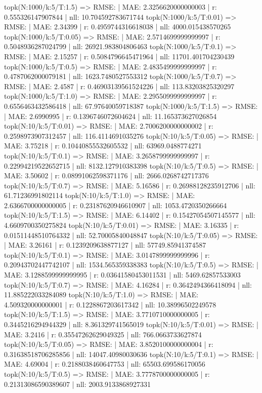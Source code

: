 topk(N:1000/k:5/T:1.5) => RMSE: | MAE: 2.3256620000000003 | r: 0.555326147907844 | nll: 10.704592783671744
topk(N:1000/k:5/T:0.01) => RMSE: | MAE: 2.34399 | r: 0.4959744316618038 | nll: 4000.015438570265
topk(N:1000/k:5/T:0.05) => RMSE: | MAE: 2.5714699999999997 | r: 0.5048936287024799 | nll: 26921.983804806463
topk(N:1000/k:5/T:0.1) => RMSE: | MAE: 2.15257 | r: 0.5084796645471964 | nll: 11701.401704230439
topk(N:1000/k:5/T:0.5) => RMSE: | MAE: 2.4835499999999997 | r: 0.4787062000079181 | nll: 1623.7480527553312
topk(N:1000/k:5/T:0.7) => RMSE: | MAE: 2.4587 | r: 0.46903139561524226 | nll: 113.83203825320297
topk(N:1000/k:5/T:1.0) => RMSE: | MAE: 2.2955099999999997 | r: 0.6556463432586418 | nll: 67.97640059718387
topk(N:1000/k:5/T:1.5) => RMSE: | MAE: 2.6990995 | r: 0.1396746072604624 | nll: 11.165373627026854
topk(N:10/k:5/T:0.01) => RMSE: | MAE: 2.7006200000000002 | r: 0.2598973907312457 | nll: 116.4114691035276
topk(N:10/k:5/T:0.05) => RMSE: | MAE: 3.75218 | r: 0.10440855532605532 | nll: 63969.0488774271
topk(N:10/k:5/T:0.1) => RMSE: | MAE: 3.2658799999999997 | r: 0.22994219522652715 | nll: 8132.127910383398
topk(N:10/k:5/T:0.5) => RMSE: | MAE: 3.50602 | r: 0.08991062598371176 | nll: 2666.0268742717376
topk(N:10/k:5/T:0.7) => RMSE: | MAE: 5.16586 | r: 0.26988128235912706 | nll: 61.71236991802114
topk(N:10/k:5/T:1.0) => RMSE: | MAE: 2.6366700000000005 | r: 0.23187620946610907 | nll: 1053.4720350266664
topk(N:10/k:5/T:1.5) => RMSE: | MAE: 6.14402 | r: 0.15427054507145577 | nll: 4.6609700350275824
topk(N:10/k:5/T:0.01) => RMSE: | MAE: 3.16335 | r: 0.01511448510764332 | nll: 52.70005840048847
topk(N:10/k:5/T:0.05) => RMSE: | MAE: 3.26161 | r: 0.1239209638877127 | nll: 57749.85941374587
topk(N:10/k:5/T:0.1) => RMSE: | MAE: 3.0147899999999996 | r: 0.20943702447742107 | nll: 1534.565359338383
topk(N:10/k:5/T:0.5) => RMSE: | MAE: 3.1288599999999995 | r: 0.03641580453011531 | nll: 5469.62857533003
topk(N:10/k:5/T:0.7) => RMSE: | MAE: 4.16284 | r: 0.3642494366418094 | nll: 11.885222033284089
topk(N:10/k:5/T:1.0) => RMSE: | MAE: 4.509320000000001 | r: 0.1228867203617342 | nll: 10.38996502249578
topk(N:10/k:5/T:1.5) => RMSE: | MAE: 3.7710710000000005 | r: 0.3445216294944329 | nll: 8.361329741565019
topk(N:10/k:5/T:0.01) => RMSE: | MAE: 3.2416 | r: 0.35547262629049325 | nll: 766.0663733627874
topk(N:10/k:5/T:0.05) => RMSE: | MAE: 3.8520100000000004 | r: 0.31638518706285856 | nll: 14047.40980030636
topk(N:10/k:5/T:0.1) => RMSE: | MAE: 4.69004 | r: 0.2188038460647753 | nll: 65503.699586170056
topk(N:10/k:5/T:0.5) => RMSE: | MAE: 3.7778700000000005 | r: 0.21313086590389607 | nll: 2003.9133868927331
